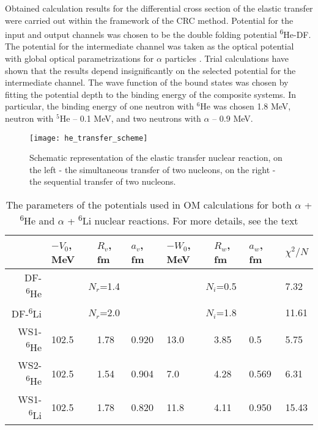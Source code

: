 \documentclass[
12pt, %
oneside, %
english, %
doublespacing, %
doublespacing, %
toctotoc, %
parskip, %
headsepline, %
]{MastersDoctoralThesis} %
\newcommand{\he}{\textsuperscript{6}He\xspace}
\newcommand{\li}{\textsuperscript{6}Li\xspace}
\begin{document}
Obtained calculation results for the differential cross section of the elastic transfer were carried out within the framework of the CRC method. Potential for the input and output channels was chosen to be the double folding potential \he-DF. The potential for the intermediate channel was taken as the optical potential with global optical parametrizations for $\alpha$ particles \cite{avrigeanu1994global}. Trial calculations have shown that the results depend insignificantly on the selected potential for the intermediate channel.
The wave function of the bound states was chosen by fitting the potential depth to the binding energy of the composite systems. 
In particular, the binding energy of one neutron with $^6$He was chosen 1.8 MeV,  neutron with $^5$He -- 0.1 MeV, and two neutrons with  $\alpha$  -- 0.9 MeV. 


\begin{figure}
\centering
\texttt{[image: he\_transfer\_scheme]}
\decoRule
\caption{    Schematic representation of the elastic transfer nuclear reaction, on the left - the simultaneous transfer of two nucleons, on the right - the sequential transfer of two nucleons.
}
\label{he_transfer_scheme}
\end{figure}
\begin{table}[tp!]
\caption{ The parameters of the potentials used in OM calculations for both $\alpha$ + \he and $\alpha$ + \li nuclear reactions. For more details, see the text}
\label{tab:he_elastic}
\begin{tabular*}{\textwidth}{@{\extracolsep{\fill}}rlllllll}
\hline
    & $-V_0$, MeV & $R_v$, fm & $a_v$, fm & $-W_0$, MeV & $R_w$, fm & $a_w$, fm & $\chi^2/N$ \\ \hline
DF-\he  & \multicolumn{3}{c}{$N_r$=1.4}        & \multicolumn{3}{c}{$N_i$=0.5}        & 7.32      \\
DF-\li  & \multicolumn{3}{c}{$N_r$=2.0}        & \multicolumn{3}{c}{$N_i$=1.8}        & 11.61      \\
WS1-\he & 102.5       & 1.78      & 0.920     & 13.0        & 3.85      & 0.5       & 5.75      \\
WS2-\he & 102.5       & 1.54      & 0.904     & 7.0         & 4.28      & 0.569     & 6.31      \\ 
WS1-\li & 102.5       & 1.78      & 0.820     & 11.8         & 4.11      & 0.950     & 15.43      \\
\hline
\end{tabular*}
\end{table}
\clearpage
\end{document}
